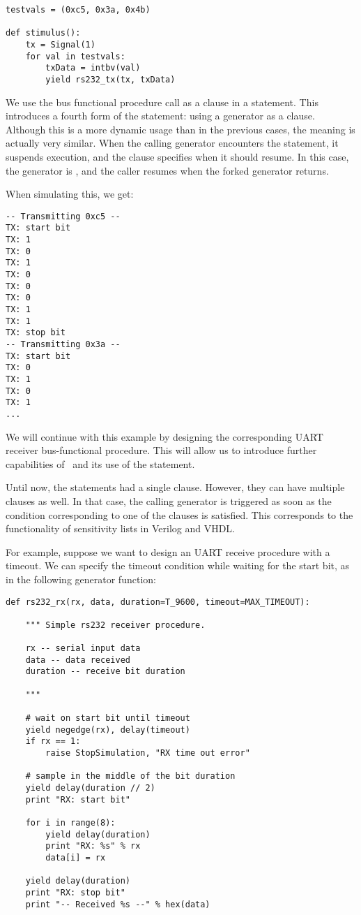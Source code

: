 \begin{verbatim}
testvals = (0xc5, 0x3a, 0x4b)

def stimulus():
    tx = Signal(1)
    for val in testvals:
        txData = intbv(val)
        yield rs232_tx(tx, txData)
\end{verbatim}

We use the bus functional procedure call as a clause in a
 statement. This introduces a fourth form of the
 statement: using a generator as a clause. Although this is
a more dynamic usage than in the previous cases, the meaning is
actually very similar. When the calling generator 
encounters the  statement, it suspends execution, and the
clause specifies when it should resume. In this case, the generator
 is , and the caller resumes
when the forked generator returns.

When simulating this, we get:

\begin{verbatim}
-- Transmitting 0xc5 --
TX: start bit
TX: 1
TX: 0
TX: 1
TX: 0
TX: 0
TX: 0
TX: 1
TX: 1
TX: stop bit
-- Transmitting 0x3a --
TX: start bit
TX: 0
TX: 1
TX: 0
TX: 1
...
\end{verbatim}

We will continue with this example by designing the corresponding UART
receiver bus-functional procedure. This will allow us to introduce
further capabilities of \myhdl\ and its use of the 
statement. 

Until now, the  statements had a single clause. However,
they can have multiple clauses as well. In that case, the calling
generator is triggered as soon as the condition corresponding to one
of the clauses is satisfied. This corresponds to the functionality of
sensitivity lists in Verilog and VHDL.

For example, suppose we want to design an UART receive procedure with
a timeout. We can specify the timeout condition while waiting for the
start bit, as in the following generator function:

\begin{verbatim}
def rs232_rx(rx, data, duration=T_9600, timeout=MAX_TIMEOUT):
    
    """ Simple rs232 receiver procedure.

    rx -- serial input data
    data -- data received
    duration -- receive bit duration
    
    """

    # wait on start bit until timeout
    yield negedge(rx), delay(timeout)
    if rx == 1:
        raise StopSimulation, "RX time out error"

    # sample in the middle of the bit duration
    yield delay(duration // 2)
    print "RX: start bit"

    for i in range(8):
        yield delay(duration)
        print "RX: %s" % rx
        data[i] = rx

    yield delay(duration)
    print "RX: stop bit"
    print "-- Received %s --" % hex(data)
\end{verbatim}


